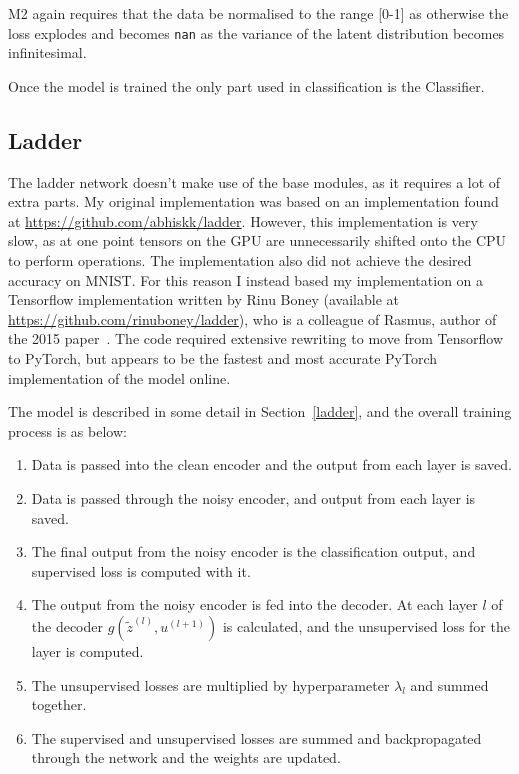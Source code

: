 M2 again requires that the data be normalised to the range [0-1] as otherwise the loss explodes and becomes 
\texttt{nan} as the variance of the latent distribution becomes infinitesimal.

Once the model is trained the only part used in classification is the Classifier.

\subsection{Ladder} \label{ladder_imp}

The ladder network doesn't make use of the base modules, as it requires a lot of extra parts. My original implementation 
was based on an implementation found at \url{https://github.com/abhiskk/ladder}. However, this implementation is very slow, as at one point 
tensors on the GPU are unnecessarily shifted onto the CPU to perform operations. The implementation also did 
not achieve the desired accuracy on MNIST. For this reason I instead based my implementation on a Tensorflow implementation written by 
Rinu Boney
(available at \url{https://github.com/rinuboney/ladder}), who is a colleague of Rasmus, author of
the 2015 paper~\cite{DBLP:journals/corr/RasmusVHBR15}. The code required extensive rewriting to move from Tensorflow to PyTorch,
but appears to be the fastest and most accurate PyTorch implementation of the model online.

The model is described in some detail in Section~\ref{ladder}, and the overall training process is as below: 
\begin{enumerate}
    \item Data is passed into the clean encoder and the output from each layer is saved.
    \item Data is passed through the noisy encoder, and output from each layer is saved.
    \item The final output from the noisy encoder is the classification output, and supervised loss is computed with it.
    \item The output from the noisy encoder is fed into the decoder. At each layer $l$ of the decoder $g(\tilde{z}^{(l)}, u^{(l+1)})$ is calculated,
          and the unsupervised loss for the layer is computed.
    \item The unsupervised losses are multiplied by hyperparameter $\lambda_{l}$ and summed together.
    \item The supervised and unsupervised losses are summed and backpropagated through the network and the weights are updated.
\end{enumerate}

